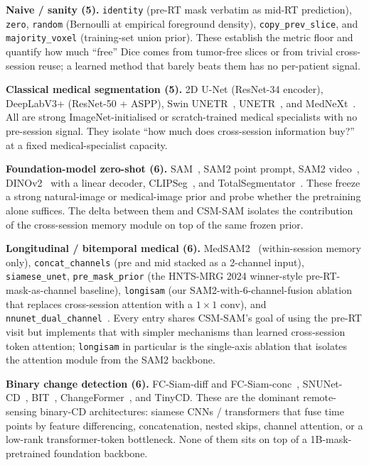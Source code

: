 \textbf{Naive / sanity (5).} \texttt{identity} (pre-RT mask verbatim
as mid-RT prediction), \texttt{zero}, \texttt{random} (Bernoulli at
empirical foreground density), \texttt{copy\_prev\_slice}, and
\texttt{majority\_voxel} (training-set union prior). These establish
the metric floor and quantify how much ``free'' Dice comes from
tumor-free slices or from trivial cross-session reuse; a learned
method that barely beats them has no per-patient signal.

\textbf{Classical medical segmentation (5).} 2D U-Net
(ResNet-34 encoder), DeepLabV3+ (ResNet-50 + ASPP),
Swin UNETR~\cite{hatamizadeh2021swinunetr},
UNETR~\cite{hatamizadeh2022unetr}, and
MedNeXt~\cite{roy2023mednext}. All are strong ImageNet-initialised or
scratch-trained medical specialists with no pre-session signal. They
isolate ``how much does cross-session information buy?'' at a fixed
medical-specialist capacity.

\textbf{Foundation-model zero-shot (6).} SAM~\cite{kirillov2023sam},
SAM2 point prompt, SAM2 video~\cite{ravi2024sam2},
DINOv2~\cite{oquab2024dinov2} with a linear decoder,
CLIPSeg~\cite{lueddecke2022clipseg}, and
TotalSegmentator~\cite{wasserthal2023totalsegmentator}. These freeze a
strong natural-image or medical-image prior and probe whether the
pretraining alone suffices. The delta between them and CSM-SAM
isolates the contribution of the cross-session memory module on top
of the same frozen prior.

\textbf{Longitudinal / bitemporal medical (6).}
MedSAM2~\cite{ma2024medsam2} (within-session memory only),
\texttt{concat\_channels} (pre and mid stacked as a 2-channel input),
\texttt{siamese\_unet}, \texttt{pre\_mask\_prior} (the HNTS-MRG 2024
winner-style pre-RT-mask-as-channel baseline),
\texttt{longisam} (our SAM2-with-6-channel-fusion ablation that
replaces cross-session attention with a $1{\times}1$ conv), and
\texttt{nnunet\_dual\_channel}~\cite{isensee2021nnunet}. Every entry
shares CSM-SAM's goal of using the pre-RT visit but implements that
with simpler mechanisms than learned cross-session token attention;
\texttt{longisam} in particular is the single-axis ablation that
isolates the attention module from the SAM2 backbone.

\textbf{Binary change detection (6).}
FC-Siam-diff and FC-Siam-conc~\cite{daudt2018fcsiam},
SNUNet-CD~\cite{fang2022snunet},
BIT~\cite{chen2021bit},
ChangeFormer~\cite{bandara2022changeformer}, and
TinyCD. These are the dominant remote-sensing binary-CD
architectures: siamese CNNs / transformers that fuse time points by
feature differencing, concatenation, nested skips, channel attention,
or a low-rank transformer-token bottleneck. None of them sits on top
of a 1B-mask-pretrained foundation backbone.

